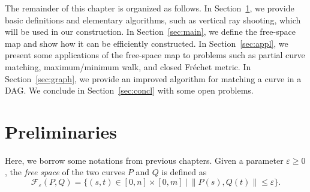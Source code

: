 \documentclass[12pt]{dalthesis}
\newcommand{\IR}{\ensuremath{\mathbb{R}}}
\newcommand{\lee}{\leqslant}
\newcommand{\gee}{\geqslant}
\newcommand{\set}[1]{{\{ #1 \}}}
\newcommand{\eps}{\varepsilon}
\newcommand{\bigOmega}{{\rm\Omega}}
\newcommand{\REM}[1]{}
\newcommand{\CF}{{\mathscr F}}
\newcommand{\Frechet}{Fr\'echet }
\newcommand{\distF}{\delta_F}
\newcommand{\Feps}{\CF_\eps}
\newcommand{\fs}{free-space }
\begin{document}
\REM{
The current lower bound
for deciding whether the \Frechet distance
between two polygonal curves with total $n$ vertices is at most a given value $\eps$,
is $\bigOmega(n \log (n))$ \cite{LowerBound-FD}.
However, no subquadratic algorithm is known for this decision problem,
and hence, it is widely accepted that the actual lower bound 
for this problem is $\bigOmega(n^2)$ (see e.g.~\cite{AltBook2009}).
If this holds, then the results
obtained in this thesis do not only represent improvements, 
but are also optimal.
}

The remainder of this chapter is organized as follows.
In Section~\ref{sec:preliminaries}, we provide basic definitions
and elementary algorithms, such as vertical ray shooting, 
which will be used in our construction. 
In Section~\ref{sec:main}, we define the \fs map and 
show how it can be efficiently constructed.
In Section~\ref{sec:appl}, we present some applications of the \fs map to problems
such as partial curve matching, maximum/minimum walk, and closed \Frechet metric.
In Section~\ref{sec:graph}, we provide an improved algorithm
for matching a curve in a DAG.
We conclude in Section~\ref{sec:concl} with some open problems.




\section{Preliminaries} 
\label{sec:preliminaries}

\REM{
A {\em polygonal curve\/} in $\IR^d$ is  a continuous function 
$P:[0,n] \rightarrow \IR^d$ such that for each $i \in \set{1, \ldots, n}$,
the restriction of $P$ to the interval $[i-1, i]$ 
is affine (i.e., forms a line segment).
The integer $n$ is called the {\em size\/} of $P$.
For each $i \in \set{1, \ldots, n}$, 
we denote the line segment $P|_{[i-1,i]}$ by $P_i$.  

A {\em monotone reparametrization} of $[0,n]$ 
is a continuous non-decreasing function $\alpha: [0,1] \rightarrow [0,n]$
with $\alpha(0)=0$ and $\alpha(1)=n$.
Given two polygonal curves $P$ and $Q$ of size $n$ and $m$, respectively, 
the {\em \Frechet distance\/} between $P$ and $Q$ is defined as
\[
	\distF(P,Q) = \inf_{\alpha, \beta} \max_{t \in [0,1]} \| P(\alpha(t)), Q(\beta(t)) \|,
\]
where $\|\!\cdot\!\|$ denotes the Euclidean metric, 
and $\alpha$ and $\beta$ range over all monotone reparameterizations of 
$[0,n]$ and $[0,m]$, respectively.
}
Here, we borrow some notations from previous 
chapters.
Given a parameter $\eps \gee 0$,
the {\em free space\/} of the two curves $P$ and $Q$ is defined as
$$
	\Feps(P,Q) = \set{(s,t) \in [0,n] \times [0,m] \ | \ \|P(s),Q(t)\| \lee \eps }.
$$
\end{document}
